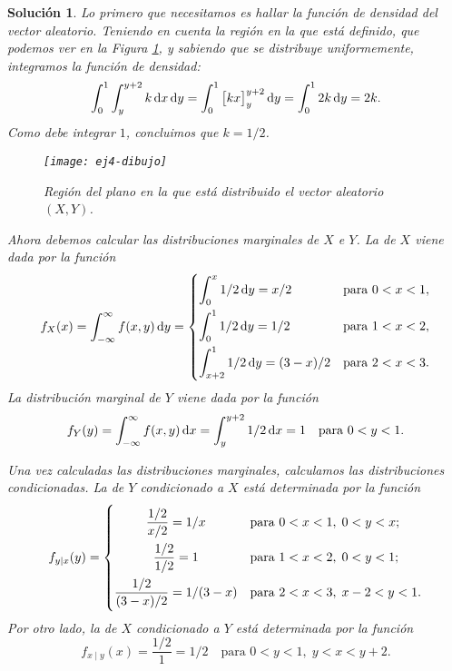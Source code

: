 \documentclass[
  a4paper,
  spanish,
  12pt,
]{scrartcl}
\theoremstyle{ejercicio-style}
\theoremstyle{remark-style}
\newtheorem*{sol}{Solución}
\begin{document}
\begin{sol}
  Lo primero que necesitamos es hallar la función de densidad del vector aleatorio. 
  Teniendo en cuenta la región en la que está definido, que podemos ver en la Figura \ref{fig:region}, y sabiendo que se distribuye uniformemente, integramos la función de densidad:
  \[
    \int_0^1\int_y^{y+2} k\dif x\dif y = \int_0^1 \big[kx\big]_{y}^{y+2} \dif y= \int_0^1 2k \dif y = 2k.
  \]
  Como debe integrar \(1\), concluimos que \(k = 1/2\).
  \begin{figure}[h]
    \centering
    \texttt{[image: ej4-dibujo]}
    \caption{Región del plano en la que está distribuido el vector aleatorio \((X,Y)\).}
    \label{fig:region}
  \end{figure}
  
  Ahora debemos calcular las distribuciones marginales de \(X\) e \(Y\). La de \(X\) viene dada por la función
  \[
    f_X(x) = \int_{-\infty}^{\infty} f(x,y) \dif y = \begin{dcases}
      \int_0^x 1/2 \dif y = x/2 & \text{para } 0 < x < 1,\\
      \int_0^1 1/2 \dif y = 1/2  & \text{para } 1 < x < 2,\\
      \int_{x+2}^1 1/2 \dif y = (3 - x)/2 & \text{para } 2 < x < 3.
    \end{dcases}
  \]
  La distribución marginal de \(Y\) viene dada por la función
  \[
    f_Y(y) = \int_{-\infty}^{\infty} f(x,y) \dif x = \int_y^{y+2} 1/2 \dif x = 1 \quad\text{para } 0 < y < 1.
  \]

  Una vez calculadas las distribuciones marginales, calculamos las distribuciones condicionadas. La de \(Y\) condicionado a \(X\) está determinada por la función
  \begin{align*}
    f_{y\mid x}(y) = \begin{dcases}
      \hfil\frac{1/2}{x/2} = 1/x & \text{para } 0 < x < 1,\; 0 < y < x;\\
      \hfil\frac{1/2}{1/2} = 1  & \text{para } 1 < x < 2,\; 0 < y < 1;\\
      \frac{1/2}{(3-x)/2} = 1/(3-x) & \text{para } 2 < x < 3,\; x-2 < y < 1.
    \end{dcases}
  \end{align*}
  Por otro lado, la de \(X\) condicionado a \(Y\) está determinada por la función
  \[
    f_{x \mid y}(x) = \frac{1/2}{1} = 1/2 \quad\text{para } 0 < y < 1,\; y < x < y+2.
  \]

\end{sol}
\end{document}
